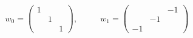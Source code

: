 \begin{equation}
w_0= \left(\begin{array}{ccc}
1  & & \\
 & 1 & \\
 & & 1 
\end{array} \right)
,~~~~~~~~~~~~w_1= \left(\begin{array}{ccc}
  & & -1\\
 & -1 & \\
-1 & & 
\end{array} \right) \nonumber
\end{equation}


